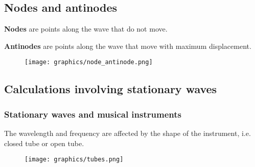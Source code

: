 \documentclass[12pt,a4paper]{article}
\begin{document}
\subsection{Nodes and antinodes}
\textbf{Nodes} are points along the wave that do not move.

\smallskip\noindent
\textbf{Antinodes} are points along the wave that move with maximum displacement.

\begin{figure}[h]
\texttt{[image: graphics/node\_antinode.png]}
\centering
\end{figure}

\subsection{Calculations involving stationary waves}
\subsubsection{Stationary waves and musical instruments}
The wavelength and frequency are affected by the shape of the instrument, i.e. closed tube or open tube.

\begin{figure}[h]
\texttt{[image: graphics/tubes.png]}
\centering
\end{figure}
\end{document}
